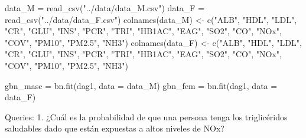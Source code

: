 \documentclass[
  11pt,
  a4paper,
]{article}
\newenvironment{Shaded}{\begin{snugshade}}{\end{snugshade}}
\newcommand{\AttributeTok}[1]{\textcolor[rgb]{0.40,0.45,0.13}{#1}}
\newcommand{\DecValTok}[1]{\textcolor[rgb]{0.68,0.00,0.00}{#1}}
\newcommand{\FloatTok}[1]{\textcolor[rgb]{0.68,0.00,0.00}{#1}}
\newcommand{\FunctionTok}[1]{\textcolor[rgb]{0.28,0.35,0.67}{#1}}
\newcommand{\NormalTok}[1]{\textcolor[rgb]{0.00,0.23,0.31}{#1}}
\newcommand{\OtherTok}[1]{\textcolor[rgb]{0.00,0.23,0.31}{#1}}
\newcommand{\SpecialCharTok}[1]{\textcolor[rgb]{0.37,0.37,0.37}{#1}}
\newcommand{\StringTok}[1]{\textcolor[rgb]{0.13,0.47,0.30}{#1}}
\begin{document}
\begin{Shaded}
\begin{Highlighting}[numbers=left,,]
\NormalTok{data\_M }\OtherTok{=} \FunctionTok{read\_csv}\NormalTok{(}\StringTok{"../data/data\_M.csv"}\NormalTok{)}
\NormalTok{data\_F }\OtherTok{=} \FunctionTok{read\_csv}\NormalTok{(}\StringTok{"../data/data\_F.csv"}\NormalTok{)}
\FunctionTok{colnames}\NormalTok{(data\_M) }\OtherTok{\textless{}{-}} \FunctionTok{c}\NormalTok{(}\StringTok{"ALB"}\NormalTok{, }\StringTok{"HDL"}\NormalTok{, }\StringTok{"LDL"}\NormalTok{, }\StringTok{"CR"}\NormalTok{, }\StringTok{"GLU"}\NormalTok{, }\StringTok{"INS"}\NormalTok{, }\StringTok{"PCR"}\NormalTok{, }\StringTok{"TRI"}\NormalTok{, }\StringTok{"HB1AC"}\NormalTok{, }\StringTok{"EAG"}\NormalTok{, }\StringTok{"SO2"}\NormalTok{, }\StringTok{"CO"}\NormalTok{, }\StringTok{"NOx"}\NormalTok{, }\StringTok{"COV"}\NormalTok{, }\StringTok{"PM10"}\NormalTok{, }\StringTok{"PM2.5"}\NormalTok{, }\StringTok{"NH3"}\NormalTok{)}
\FunctionTok{colnames}\NormalTok{(data\_F) }\OtherTok{\textless{}{-}} \FunctionTok{c}\NormalTok{(}\StringTok{"ALB"}\NormalTok{, }\StringTok{"HDL"}\NormalTok{, }\StringTok{"LDL"}\NormalTok{, }\StringTok{"CR"}\NormalTok{, }\StringTok{"GLU"}\NormalTok{, }\StringTok{"INS"}\NormalTok{, }\StringTok{"PCR"}\NormalTok{, }\StringTok{"TRI"}\NormalTok{, }\StringTok{"HB1AC"}\NormalTok{, }\StringTok{"EAG"}\NormalTok{, }\StringTok{"SO2"}\NormalTok{, }\StringTok{"CO"}\NormalTok{, }\StringTok{"NOx"}\NormalTok{, }\StringTok{"COV"}\NormalTok{, }\StringTok{"PM10"}\NormalTok{, }\StringTok{"PM2.5"}\NormalTok{, }\StringTok{"NH3"}\NormalTok{)}
\end{Highlighting}
\end{Shaded}

\begin{Shaded}
\begin{Highlighting}[numbers=left,,]
\NormalTok{gbn\_masc }\OtherTok{=} \FunctionTok{bn.fit}\NormalTok{(dag1, }\AttributeTok{data =}\NormalTok{ data\_M)}
\NormalTok{gbn\_fem }\OtherTok{=} \FunctionTok{bn.fit}\NormalTok{(dag1, }\AttributeTok{data =}\NormalTok{ data\_F)}
\end{Highlighting}
\end{Shaded}

Queries: 1. ¿Cuál es la probabilidad de que una persona tenga los
triglicéridos saludables dado que están expuestas a altos niveles de
NOx?

\begin{Shaded}
\end{Shaded}
\end{document}
